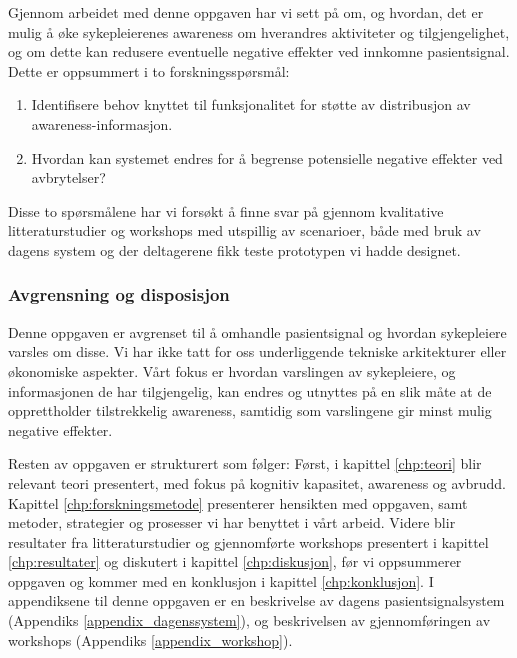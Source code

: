 \noindent
Gjennom arbeidet med denne oppgaven har vi sett på om, og hvordan, det er mulig å øke sykepleierenes awareness om hverandres aktiviteter og tilgjengelighet, og om dette kan redusere eventuelle negative effekter ved innkomne pasientsignal. Dette er oppsummert i to forskningsspørsmål:

\begin{enumerate}
  \item Identifisere behov knyttet til funksjonalitet for støtte av distribusjon av awareness-informasjon.
  \item Hvordan kan systemet endres for å begrense potensielle negative effekter ved avbrytelser?
\end{enumerate}

\noindent
Disse to spørsmålene har vi forsøkt å finne svar på gjennom kvalitative litteraturstudier og workshops med utspillig av scenarioer, både med bruk av dagens system og der deltagerene fikk teste prototypen vi hadde designet. 

\subsubsection{Avgrensning og disposisjon}
Denne oppgaven er avgrenset til å omhandle pasientsignal og hvordan sykepleiere varsles om disse. Vi har ikke tatt for oss underliggende tekniske arkitekturer eller økonomiske aspekter. Vårt fokus er hvordan varslingen av sykepleiere, og informasjonen de har tilgjengelig, kan endres og utnyttes på en slik måte at de opprettholder tilstrekkelig awareness, samtidig som varslingene gir minst mulig negative effekter.

\noindent
Resten av oppgaven er strukturert som følger: Først, i kapittel \ref{chp:teori} blir relevant teori presentert, med fokus på kognitiv kapasitet, awareness og avbrudd. Kapittel \ref{chp:forskningsmetode} presenterer hensikten med oppgaven, samt metoder, strategier og prosesser vi har benyttet i vårt arbeid. Videre blir resultater fra litteraturstudier og gjennomførte workshops presentert i kapittel \ref{chp:resultater} og diskutert i kapittel \ref{chp:diskusjon}, før vi oppsummerer oppgaven og kommer med en konklusjon i kapittel \ref{chp:konklusjon}. I appendiksene til denne oppgaven er en beskrivelse av dagens pasientsignalsystem (Appendiks \ref{appendix_dagenssystem}), og beskrivelsen av gjennomføringen av workshops (Appendiks \ref{appendix_workshop}).